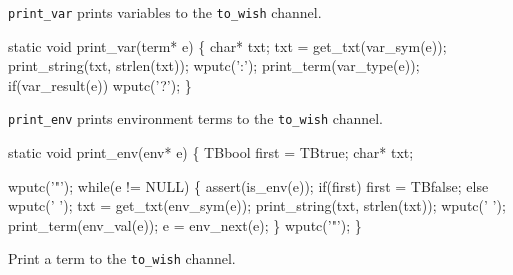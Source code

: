
{\tt print_var} prints variables to the {\tt to\_wish} channel.

\nwenddocs{}\endmoddef\let\nwnotused=\nwoutput{}\nwstartdeflinemarkup{}\nwenddeflinemarkup
static void print_var(term* e)
\{
   char* txt;
   txt = get_txt(var_sym(e));
   print_string(txt, strlen(txt));
   wputc(':');
   print_term(var_type(e));
   if(var_result(e))
     wputc('?');
\}
\nwendcode{}\nwdocspar


{\tt print_env} prints environment terms to the {\tt to\_wish} channel.

\nwenddocs{}\endmoddef\let\nwnotused=\nwoutput{}\nwstartdeflinemarkup{}\nwenddeflinemarkup
static void print_env(env* e)
\{
   TBbool first = TBtrue;
   char* txt;
   
   wputc('"');
   while(e != NULL)
   \{
      assert(is_env(e));
      if(first)
        first = TBfalse;
      else
        wputc(' ');
      txt = get_txt(env_sym(e));
      print_string(txt, strlen(txt));
      wputc(' ');
      print_term(env_val(e));
      e = env_next(e);
   \}
   wputc('"');
\}
\nwendcode{}\nwdocspar



Print a term to the {\tt to\_wish} channel.

